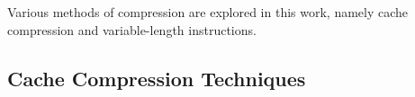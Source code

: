 Various methods of compression are explored in this work, namely cache compression and variable-length instructions.

\subsection{Cache Compression Techniques}
